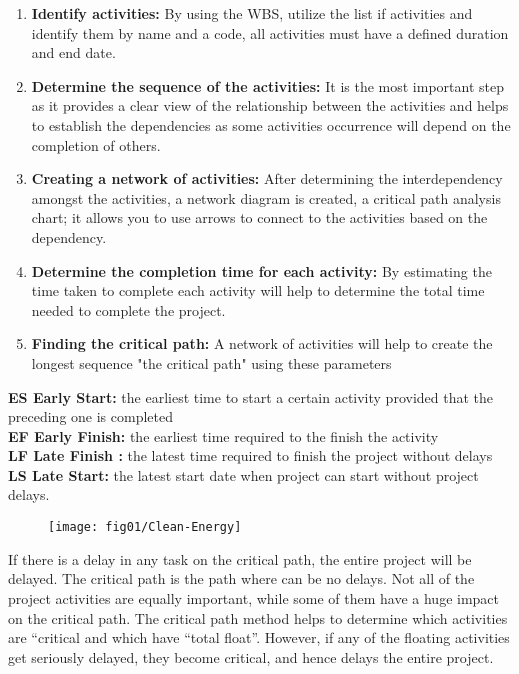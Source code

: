 \begin{enumerate}
	\item \textbf{Identify activities:} By using the WBS, utilize the list if activities and identify them by name and a code, all activities must have a defined duration and end date.
		\item \textbf{Determine the sequence of the activities:} It is the most important step as it provides a clear view of the relationship between the activities and helps to establish the dependencies as some activities occurrence will depend on the completion of others.
			\item \textbf{Creating a network of activities:} After determining the interdependency amongst the activities, a network diagram is created, a critical path analysis chart; it allows you to use arrows to connect to the activities based on the dependency.
			
				\item \textbf{Determine the completion time for each activity:}  By estimating the time taken to complete each activity will help to determine the total time needed to complete the project.
					\item \textbf{Finding the critical path:} A network of activities will help to create the longest sequence "the critical path" using these parameters 
					
\end{enumerate}

\textbf{ES Early Start:} the earliest time to start a certain activity provided that the preceding one is completed \\
\textbf{EF Early Finish:} the earliest time required to the finish the activity  \\
\textbf{LF Late Finish :} the latest time required to finish the project without delays \\
\textbf{LS Late Start:} the latest start date when project can start without project delays. \\


\begin{figure}
	\centering
	\texttt{[image: fig01/Clean-Energy]}
\end{figure}


If there is a delay in any task on the critical path, the entire project will be delayed. The critical path is the path where can be no delays. Not all of the project activities are equally important, while some of them have a huge impact on the critical path. The critical path method helps to determine which activities are “critical and which have “total float”. However, if any of the floating activities get seriously delayed, they become critical, and hence delays the entire project.

